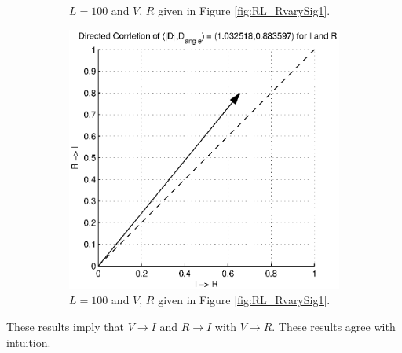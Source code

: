 \documentclass[a4paper,11pt]{article}
\begin{document}
\begin{figure}[h!t]
\begin{subfigure}[b]{0.25\textwidth}
\caption{$L = 100$ and $V$, $R$ given in Figure  \ref{fig:RL_RvarySig1}.}
\end{subfigure}
\begin{subfigure}[b]{0.25\textwidth}
\label{fig:RL_RvarySig1CCMIR}
\includegraphics[scale=0.4]{graphics/RL_RvarySig1CCMRI.eps}
\caption{$L = 100$ and $V$, $R$ given in Figure  \ref{fig:RL_RvarySig1}.}
\end{subfigure}
\caption{}
\end{figure}
These results imply that $V\rightarrow I$ and $R\rightarrow I$ with $V\rightarrow R$.  These results agree with intuition.  
\end{document}
